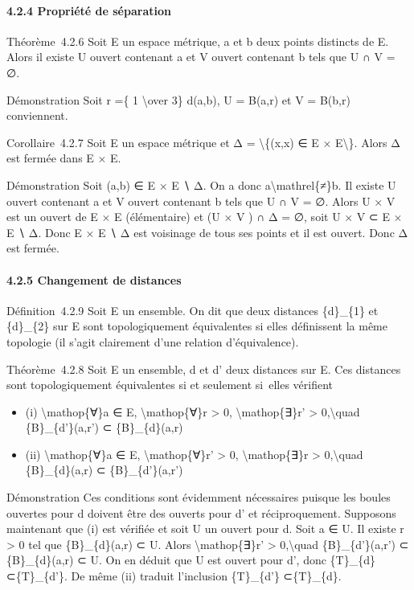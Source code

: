 \documentclass[]{article}
\begin{document}
\paragraph{4.2.4 Propriété de séparation}

Théorème~4.2.6 Soit E un espace métrique, a et b deux points distincts
de E. Alors il existe U ouvert contenant a et V ouvert contenant b tels
que U ∩ V = ∅.

Démonstration Soit r =\{ 1 \textbackslash{}over 3\} d(a,b), U = B(a,r)
et V = B(b,r) conviennent.

Corollaire~4.2.7 Soit E un espace métrique et Δ =
\textbackslash{}\{(x,x) ∈ E × E\textbackslash{}\}. Alors Δ est fermée
dans E × E.

Démonstration Soit (a,b) ∈ E × E ∖ Δ. On a donc
a\textbackslash{}mathrel\{≠\}b. Il existe U ouvert contenant a et V
ouvert contenant b tels que U ∩ V = ∅. Alors U × V est un ouvert de E ×
E (élémentaire) et (U × V ) ∩ Δ = ∅, soit U × V ⊂ E × E ∖ Δ. Donc E × E
∖ Δ est voisinage de tous ses points et il est ouvert. Donc Δ est
fermée.

\paragraph{4.2.5 Changement de distances}

Définition~4.2.9 Soit E un ensemble. On dit que deux distances
\{d\}\_\{1\} et \{d\}\_\{2\} sur E sont topologiquement équivalentes si
elles définissent la même topologie (il s'agit clairement d'une relation
d'équivalence).

Théorème~4.2.8 Soit E un ensemble, d et d' deux distances sur E. Ces
distances sont topologiquement équivalentes si et seulement si~elles
vérifient

\begin{itemize}
\itemsep1pt\parskip0pt
\item
  (i) \textbackslash{}mathop\{∀\}a ∈ E, \textbackslash{}mathop\{∀\}r
  \textgreater{} 0, \textbackslash{}mathop\{∃\}r' \textgreater{}
  0,\textbackslash{}quad \{B\}\_\{d'\}(a,r') ⊂ \{B\}\_\{d\}(a,r)
\item
  (ii) \textbackslash{}mathop\{∀\}a ∈ E, \textbackslash{}mathop\{∀\}r'
  \textgreater{} 0, \textbackslash{}mathop\{∃\}r \textgreater{}
  0,\textbackslash{}quad \{B\}\_\{d\}(a,r) ⊂ \{B\}\_\{d'\}(a,r')
\end{itemize}

Démonstration Ces conditions sont évidemment nécessaires puisque les
boules ouvertes pour d doivent être des ouverts pour d' et
réciproquement. Supposons maintenant que (i) est vérifiée et soit U un
ouvert pour d. Soit a ∈ U. Il existe r \textgreater{} 0 tel que
\{B\}\_\{d\}(a,r) ⊂ U. Alors \textbackslash{}mathop\{∃\}r'
\textgreater{} 0,\textbackslash{}quad \{B\}\_\{d'\}(a,r') ⊂
\{B\}\_\{d\}(a,r) ⊂ U. On en déduit que U est ouvert pour d', donc
\{T\}\_\{d\} ⊂\{T\}\_\{d'\}. De même (ii) traduit l'inclusion
\{T\}\_\{d'\} ⊂\{T\}\_\{d\}.
\end{document}
